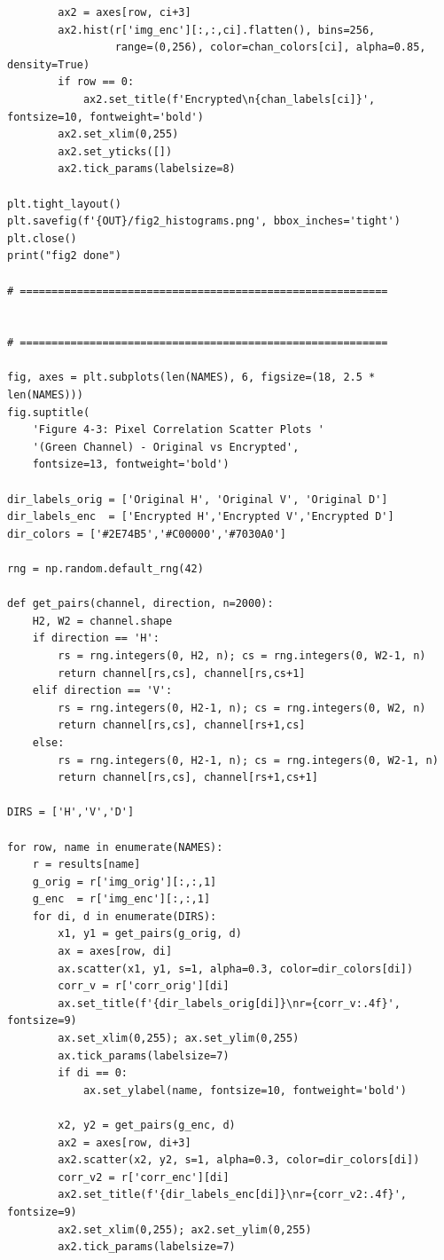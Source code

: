 \begin{verbatim}
        ax2 = axes[row, ci+3]
        ax2.hist(r['img_enc'][:,:,ci].flatten(), bins=256,
                 range=(0,256), color=chan_colors[ci], alpha=0.85, density=True)
        if row == 0:
            ax2.set_title(f'Encrypted\n{chan_labels[ci]}', fontsize=10, fontweight='bold')
        ax2.set_xlim(0,255)
        ax2.set_yticks([])
        ax2.tick_params(labelsize=8)

plt.tight_layout()
plt.savefig(f'{OUT}/fig2_histograms.png', bbox_inches='tight')
plt.close()
print("fig2 done")

# ==========================================================


# ==========================================================

fig, axes = plt.subplots(len(NAMES), 6, figsize=(18, 2.5 * len(NAMES)))
fig.suptitle(
    'Figure 4-3: Pixel Correlation Scatter Plots '
    '(Green Channel) - Original vs Encrypted',
    fontsize=13, fontweight='bold')

dir_labels_orig = ['Original H', 'Original V', 'Original D']
dir_labels_enc  = ['Encrypted H','Encrypted V','Encrypted D']
dir_colors = ['#2E74B5','#C00000','#7030A0']

rng = np.random.default_rng(42)

def get_pairs(channel, direction, n=2000):
    H2, W2 = channel.shape
    if direction == 'H':
        rs = rng.integers(0, H2, n); cs = rng.integers(0, W2-1, n)
        return channel[rs,cs], channel[rs,cs+1]
    elif direction == 'V':
        rs = rng.integers(0, H2-1, n); cs = rng.integers(0, W2, n)
        return channel[rs,cs], channel[rs+1,cs]
    else:
        rs = rng.integers(0, H2-1, n); cs = rng.integers(0, W2-1, n)
        return channel[rs,cs], channel[rs+1,cs+1]

DIRS = ['H','V','D']

for row, name in enumerate(NAMES):
    r = results[name]
    g_orig = r['img_orig'][:,:,1]
    g_enc  = r['img_enc'][:,:,1]
    for di, d in enumerate(DIRS):
        x1, y1 = get_pairs(g_orig, d)
        ax = axes[row, di]
        ax.scatter(x1, y1, s=1, alpha=0.3, color=dir_colors[di])
        corr_v = r['corr_orig'][di]
        ax.set_title(f'{dir_labels_orig[di]}\nr={corr_v:.4f}', fontsize=9)
        ax.set_xlim(0,255); ax.set_ylim(0,255)
        ax.tick_params(labelsize=7)
        if di == 0:
            ax.set_ylabel(name, fontsize=10, fontweight='bold')

        x2, y2 = get_pairs(g_enc, d)
        ax2 = axes[row, di+3]
        ax2.scatter(x2, y2, s=1, alpha=0.3, color=dir_colors[di])
        corr_v2 = r['corr_enc'][di]
        ax2.set_title(f'{dir_labels_enc[di]}\nr={corr_v2:.4f}', fontsize=9)
        ax2.set_xlim(0,255); ax2.set_ylim(0,255)
        ax2.tick_params(labelsize=7)


\end{verbatim}
